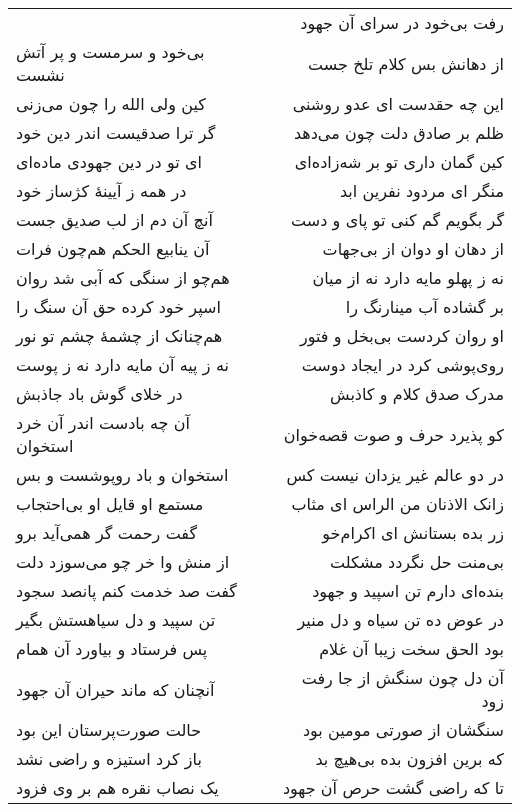 \begin{center}
\begin{longtable}{l p{0.5cm} r}
&&
رفت بی‌خود در سرای آن جهود
\\
بی‌خود و سرمست و پر آتش نشست
&&
از دهانش بس کلام تلخ جست
\\
کین ولی الله را چون می‌زنی
&&
این چه حقدست ای عدو روشنی
\\
گر ترا صدقیست اندر دین خود
&&
ظلم بر صادق دلت چون می‌دهد
\\
ای تو در دین جهودی ماده‌ای
&&
کین گمان داری تو بر شه‌زاده‌ای
\\
در همه ز آیینهٔ کژساز خود
&&
منگر ای مردود نفرین ابد
\\
آنچ آن دم از لب صدیق جست
&&
گر بگویم گم کنی تو پای و دست
\\
آن ینابیع الحکم هم‌چون فرات
&&
از دهان او دوان از بی‌جهات
\\
هم‌چو از سنگی که آبی شد روان
&&
نه ز پهلو مایه دارد نه از میان
\\
اسپر خود کرده حق آن سنگ را
&&
بر گشاده آب مینارنگ را
\\
هم‌چنانک از چشمهٔ چشم تو نور
&&
او روان کردست بی‌بخل و فتور
\\
نه ز پیه آن مایه دارد نه ز پوست
&&
روی‌پوشی کرد در ایجاد دوست
\\
در خلای گوش باد جاذبش
&&
مدرک صدق کلام و کاذبش
\\
آن چه بادست اندر آن خرد استخوان
&&
کو پذیرد حرف و صوت قصه‌خوان
\\
استخوان و باد روپوشست و بس
&&
در دو عالم غیر یزدان نیست کس
\\
مستمع او قایل او بی‌احتجاب
&&
زانک الاذنان من الراس ای مثاب
\\
گفت رحمت گر همی‌آید برو
&&
زر بده بستانش ای اکرام‌خو
\\
از منش وا خر چو می‌سوزد دلت
&&
بی‌منت حل نگردد مشکلت
\\
گفت صد خدمت کنم پانصد سجود
&&
بنده‌ای دارم تن اسپید و جهود
\\
تن سپید و دل سیاهستش بگیر
&&
در عوض ده تن سیاه و دل منیر
\\
پس فرستاد و بیاورد آن همام
&&
بود الحق سخت زیبا آن غلام
\\
آنچنان که ماند حیران آن جهود
&&
آن دل چون سنگش از جا رفت زود
\\
حالت صورت‌پرستان این بود
&&
سنگشان از صورتی مومین بود
\\
باز کرد استیزه و راضی نشد
&&
که برین افزون بده بی‌هیچ بد
\\
یک نصاب نقره هم بر وی فزود
&&
تا که راضی گشت حرص آن جهود
\\
\end{longtable}
\end{center}
